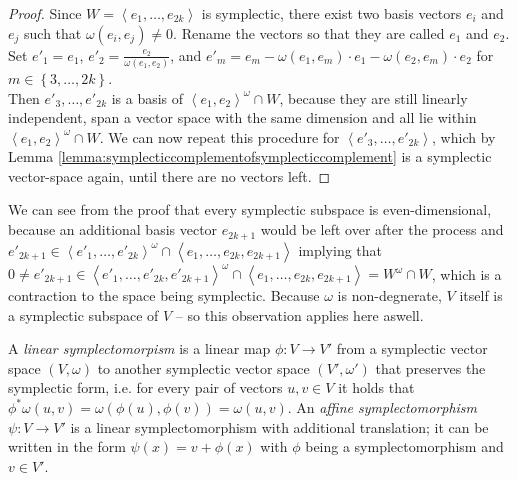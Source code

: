 \documentclass[../SymplecticSimplices.tex]{subfiles}
\begin{document}
\begin{proof}
  Since \( W = \left< e_1, \dots, e_{2k} \right> \) is symplectic, there exist two basis vectors \( e_i \) and \( e_j \) such that \( \omega \left( e_i, e_j \right) \neq 0 \). Rename the vectors so that they are called \( e_1 \) and \( e_2 \).\\
  Set \( e'_1 = e_1 \), \( e'_2 = \frac{e_2}{\omega \left( e_1, e_2 \right)} \), and \( e'_m = e_m - \omega \left( e_1, e_m \right) \cdot e_1 - \omega \left( e_2, e_m \right) \cdot e_2 \) for \( m \in \left\lbrace 3, \dots, 2k \right\rbrace \).\\
  Then \( e'_3, \dots, e'_{2k} \) is a basis of \( \left<e_1, e_2\right>^{\omega} \cap W \), because they are still linearly independent, span a vector space with the same dimension and all lie within \( \left<e_1, e_2\right>^{\omega} \cap W \). We can now repeat this procedure for \( \left< e'_3, \dots, e'_{2k} \right> \), which by Lemma \ref{lemma:symplecticcomplementofsymplecticcomplement} is a symplectic vector-space again, until there are no vectors left.
\end{proof}

We can see from the proof that every symplectic subspace is even-dimensional, because an additional basis vector \( e_{2k+1} \) would be left over after the process and \( e'_{2k+1} \in \left< e'_1, \dots, e'_{2k} \right>^\omega \cap \left< e_1, \dots, e_{2k}, e_{2k+1} \right>\) implying that \( 0 \neq e'_{2k+1} \in \left< e'_1, \dots, e'_{2k}, e'_{2k+1} \right>^\omega \cap \left< e_1, \dots, e_{2k}, e_{2k+1} \right> = W^\omega \cap W \), which is a contraction to the space being symplectic. Because \( \omega \) is non-degnerate, \( V \) itself is a symplectic subspace of \( V \) -- so this observation applies here aswell.

A \textit{linear symplectomorpism} is a linear map \( \phi: V \rightarrow V' \) from a symplectic vector space \( \left( V, \omega \right) \) to another symplectic vector space \( \left( V', \omega' \right) \) that preserves the symplectic form, i.e. for every pair of vectors \( u, v \in V \) it holds that \( \phi^\ast \omega \left( u, v \right) = \omega \left( \phi \left( u \right), \phi \left( v \right) \right) = \omega \left( u, v \right) \). An \textit{affine symplectomorphism} \( \psi: V \rightarrow V' \) is a linear symplectomorphism with additional translation; it can be written in the form \( \psi \left( x \right) = v + \phi \left( x \right) \) with \( \phi \) being a symplectomorphism and \( v \in V' \).
\end{document}
